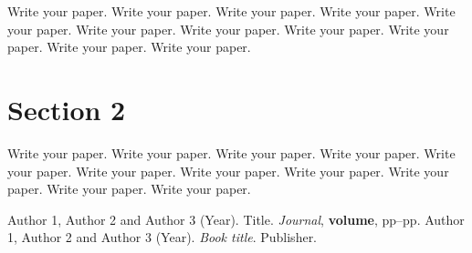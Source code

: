 \documentclass[12pt]{article}
\begin{document}
Write your paper. Write your paper. Write your paper. Write your paper. Write your paper. Write your paper. Write your paper. Write your paper. Write your paper. Write your paper. Write your paper.

\section{Section 2}

Write your paper. Write your paper. Write your paper. Write your paper. Write your paper. Write your paper. Write your paper. Write your paper. Write your paper. Write your paper. Write your paper. 



\begin{thebibliography}{99}
 Author 1, Author 2  and Author 3 (Year). Title. \textit{Journal}, \textbf{volume}, pp--pp.
 Author 1, Author 2  and Author 3 (Year). \textit{Book title}. Publisher.
\end{thebibliography}
\end{document}
